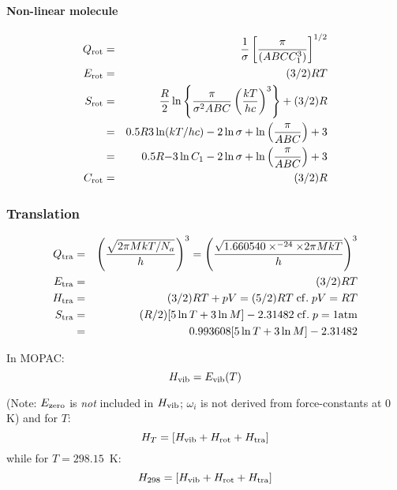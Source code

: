 \paragraph*{Non-linear molecule}
\begin{eqnarray}
Q_{\rm rot} & = & \frac{1}{\sigma}
\left[\frac{\pi}{(A B C C_1^3)}\right]^{1/2} \nonumber\label{eq45}\\
E_{\rm rot} & = & (3/2)RT        \nonumber\label{eq46} \\
S_{\rm rot} & = & \frac{R}{2}\ln\left\{\frac{\pi}{\sigma^2ABC}
\left(\frac{kT}{hc}\right)^3 \right\} + (3/2)R \nonumber \\
& = & 0.5R { 3\ln(kT/hc) - 2\ln\sigma +\ln\left(\frac{\pi}{A B C}\right) + 3}
\nonumber\label{eq47} \\
& = & 0.5R { -3\ln C_1 - 2\ln\sigma + \ln\left(\frac{\pi}{A B C}\right) + 3}
\nonumber \\
C_{\rm rot} & = & (3/2)R     \nonumber\label{eq48}
\end{eqnarray}

\subsubsection{Translation}
\begin{eqnarray}
Q_{\rm tra} & = &
   \left( \frac{\sqrt{2\pi MkT/N_a}}{h} \right)^3
=  \left( \frac{\sqrt{1.660540\times^{-24}\times 2\pi MkT}}{h} \right)^3
\nonumber\label{eq49} \\
E_{\rm tra} & = &  (3/2)RT                    \nonumber\label{eq50} \\
H_{\rm tra} & = &  (3/2)RT + pV = (5/2)RT \; {\rm cf.}
\;pV = RT  \nonumber\label{eq51}\\
S_{\rm tra} & = & (R/2) [ 5\ln T + 3\ln M ] - 2.31482
\;{\rm cf.}\; p = 1 {\rm atm} \nonumber \\
& = & 0.993608 [ 5\ln T + 3\ln M] - 2.31482    \nonumber\label{eq52}
\end{eqnarray}

In MOPAC:
\begin{equation}
H _{\rm vib} = E_{\rm vib}(T)     \nonumber\label{eq53}
\end{equation}

(Note: $E_{\rm zero}$ is {\em not\/} included in $H_{\rm vib}$;
$\omega_i$ is not derived from force-constants at 0 K)
and for $T$:
\begin{equation}
H_T   = [H_{\rm vib} + H_{\rm rot} + H_{\rm tra}]   \nonumber\label{eq54}
\end{equation}
while for $T=298.15$~K:
\begin{equation}
H_{298} = [H_{\rm vib} + H_{\rm rot} + H_{\rm tra}]  \nonumber\label{eq55}
\end{equation}

